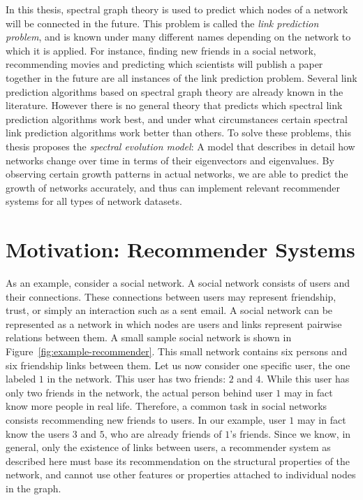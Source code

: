 \documentclass[11pt,a4paper]{book}
\begin{document}
In this thesis, spectral graph theory is used to predict which nodes of
a network will be connected in the future.  This problem is called the
\emph{link prediction problem}, and is known under many different names
depending on the network to which it is applied.  For instance,
finding new friends in a social network, recommending movies and
predicting which scientists will publish a paper together in the future
are all instances of the link prediction problem. 
Several link prediction algorithms based on spectral graph theory are
already known in the literature.  However
there is no general theory that predicts which spectral link prediction
algorithms work best, and under what circumstances certain spectral link prediction
algorithms work better than others.  To solve these problems, this thesis
proposes the \emph{spectral evolution model}:  A model that describes in
detail how networks change over time in terms of their eigenvectors and
eigenvalues. 
By observing certain growth patterns in actual
networks, we are able to predict the growth of networks accurately, and
thus can implement relevant recommender systems for all types of network
datasets. 

\section{Motivation:  Recommender Systems}
As an example, consider a social network.  
A social network consists of users and their connections.  These
connections between users may represent friendship, trust, or simply
an interaction such as a sent email.  A social network can be represented as a
network in which nodes are users and links represent pairwise relations
between them.  A small sample social network is shown in
Figure~\ref{fig:example-recommender}.  This small network contains six
persons and six friendship links between them.  Let us now consider one
specific user, the one labeled $1$ in the network.  This user
has two friends:  $2$ and $4$.  
While this user has only two friends in the network, the actual
person behind user $1$ may in fact know more people in real
life.  Therefore, a common task in social networks consists recommending
new friends to users.  In our example, user $1$ may in
fact know the users $3$ and $5$, who are already friends of
$1$'s friends.  
Since we know, in general, only the existence of links between users, a
recommender system as described here must base its recommendation on the
structural properties of the network, and cannot use other features or
properties attached to individual nodes in the graph. 
\end{document}
